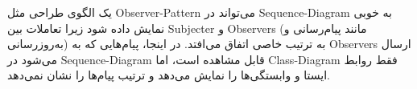 یک الگوی طراحی مثل Observer-Pattern می‌تواند در Sequence-Diagram به خوبی نمایش داده شود زیرا تعاملات بین Subjecter و Observers (مانند پیام‌رسانی و به‌روزرسانی) به ترتیب خاصی اتفاق می‌افتد. در اینجا، پیام‌هایی که به Observers ارسال می‌شود در Sequence-Diagram قابل مشاهده است، اما Class-Diagram فقط روابط ایستا و وابستگی‌ها را نمایش می‌دهد و ترتیب پیام‌ها را نشان نمی‌دهد.